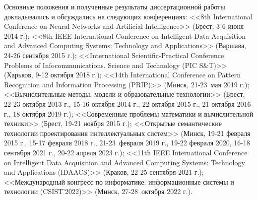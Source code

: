 Основные положения и полученные результаты диссертационной работы докладывались и обсуждались на следующих конференциях: <<8th International Conference on Neural Networks and Artificial Intelligence>> (Брест, 3-6 июня 2014 г.); <<8th IEEE International Conference on Intelligent Data Acquisition and Advanced Computing Systems: Technology and Applications>> (Варшава, 24-26 сентября 2015 г.); <<International Scientific-Practical Conference Problems of Infocommunications. Science and Technology (PIC S\&T)>> (Харьков, 9-12 октября 2018 г.); <<14th International Conference on Pattern Recognition and Information Processing (PRIP)>> (Минск, 21-23~мая 2019 г.); <<Вычислительные методы, модели и образовательные технологии>> (Брест, 22-23 октября 2013 г., 15-16 октября 2014 г., 22 октября 2015 г., 21 октября 2016 г., 18 октября 2019 г.); <<Современные проблемы математики и вычислительной техники>> (Брест, 19-21 ноября 2015 г.); <<Открытые семантические технологии проектирования интеллектуальных систем>> (Минск, 19-21 февраля 2015 г., 15-17 февраля 2018 г., 21-23~февраля 2019 г., 19-22 февраля 2020, 16-18 сентября 2021 г., 20-22 апреля 2023 г.); <<11th IEEE International Conference on Intelligent Data Acquisition and Advanced Computing Systems: Technology and Applications (IDAACS)>> (Краков, 22-25 сентября 2021 г.); <<Международный конгресс по информатике: информационные системы и технологии (CSIST'2022)>> (Минск, 27-28~октября 2022 г.).

